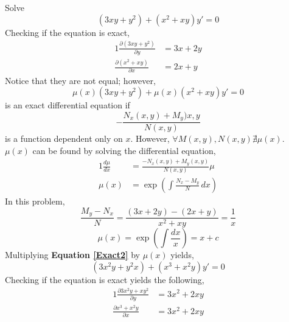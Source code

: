 \documentclass[diffeq.tex]{subfiles}
\begin{document}
    \begin{example}
        Solve
        \begin{equation}
            \label{Exact2}
            (3xy + y^{2}) + (x^{2} + xy)y' = 0
        \end{equation}
        Checking if the equation is exact,
        \begin{alignat}{1}
            \frac{\partial (3xy + y^{2})}{\partial y} &= 3x + 2y\\
            \frac{\partial (x^{2} + xy)}{\partial x} &= 2x + y
        \end{alignat}
        Notice that they are not equal; however,
        \begin{equation}
            \mu(x)(3xy + y^{2}) + \mu(x)(x^{2} + xy)y' = 0
        \end{equation}
        is an exact differential equation if
        \begin{equation}
            -\frac{N_{x}(x, y) + M_{y})x, y}{N(x, y)}
        \end{equation}
        is a function dependent only on $x$. However, $\forall M(x, y), N(x, y) \nexists \mu(x)$. $\mu(x)$ can be found by solving the differential equation,
        \begin{alignat}{1}
            \frac{d\mu}{dx} &= \frac{-N_{x}(x, y) + M_{y}(x, y)}{N(x, y)}\mu\\
            \mu(x) &= \exp\left(\int\frac{N_{x} - M_{y}}{N}\,dx\right)
        \end{alignat}
        In this problem,
        \begin{equation}
            \frac{M_{y} - N_{x}}{N} = \frac{(3x + 2y) - (2x + y)}{x^2 + xy} = \frac{1}{x}
        \end{equation}
        \begin{equation}
            \mu(x) = \exp\left(\int\frac{dx}{x}\right) = x + c
        \end{equation}
        Multiplying \textbf{Equation \ref{Exact2}} by $\mu(x)$ yields,
        \begin{equation}
            (3x^{2}y + y^{2}x) + (x^{3} + x^{2}y)y' = 0
        \end{equation}
        Checking if the equation is exact yields the following,
        \begin{alignat}{1}
            \frac{\partial 3x^{2}y + xy^{2}}{\partial y} &= 3x^{2} + 2xy\\
            \frac{\partial x^{3} + x^{2}y}{\partial x} &= 3x^{2} + 2xy
        \end{alignat}

\end{example}
\end{document}
